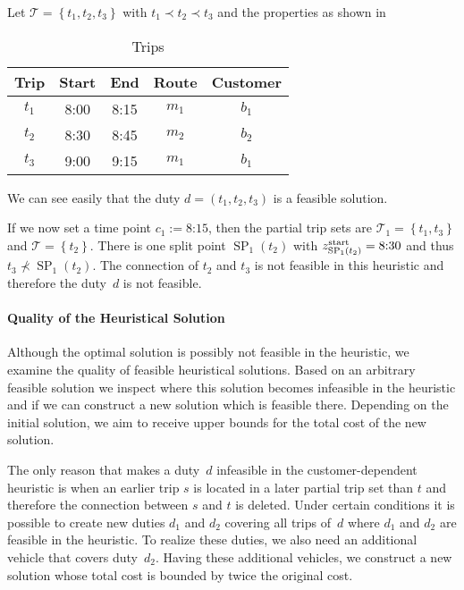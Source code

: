 \begin{example}
\label{ex:equivalence_MMILP_CMILP}

Let ${\mathcal{T}=\left\{t_1, t_2, t_3\right\}}$ with ${t_1\prec t_2\prec t_3}$ and the properties as shown in 

\begin{table}[htb]
	\centering
	\begin{tabular}{c|cccc}
		Trip & Start & End & Route & Customer \\
		\hline
		$t_1$ & 8:00 & 8:15 & $m_1$ & $b_1$ \\
		$t_2$ & 8:30 & 8:45 & $m_2$ & $b_2$ \\
		$t_3$ & 9:00 & 9:15 & $m_1$ & $b_1$ \\
	\end{tabular}
	\caption{Trips}
	\label{tab:customer_heuristic_example}
\end{table}

We can see easily that the duty ${d=\left(t_1,t_2,t_3\right)}$ is a feasible solution. 

If we now set a time point ${c_1 := \text{8:15}}$, then the partial trip sets are ${\mathcal{T}_1=\left\{t_1,t_3\right\}}$ and ${\mathcal{T}=\left\{t_2\right\}}$. There is one split point ${\operatorname{SP}_1\left(t_2\right)}$ with ${z^{\operatorname{start}}_{\operatorname{SP}_1\left(t_2\right)} = \text{8:30}}$ and thus ${t_3\not\prec\operatorname{SP}_1\left(t_2\right)}$. The connection of $t_2$ and $t_3$ is not feasible in this heuristic and therefore the duty~$d$ is not feasible.

\end{example}

\paragraph{Quality of the Heuristical Solution} \parfill

Although the optimal solution is possibly not feasible in the heuristic, we examine the quality of feasible heuristical solutions. Based on an arbitrary feasible solution we inspect where this solution becomes infeasible in the heuristic and if we can construct a new solution which is feasible there. Depending on the initial solution, we aim to receive upper bounds for the total cost of the new solution. 

The only reason that makes a duty~$d$ infeasible in the customer-dependent heuristic is when an earlier trip $s$ is located in a later partial trip set than $t$ and therefore the connection between $s$ and $t$ is deleted. Under certain conditions it is possible to create new duties $d_1$ and $d_2$ covering all trips of~$d$ where $d_1$ and $d_2$ are feasible in the heuristic. To realize these duties, we also need an additional vehicle that covers duty~$d_2$. Having these additional vehicles, we construct a new solution whose total cost is bounded by twice the original cost.

